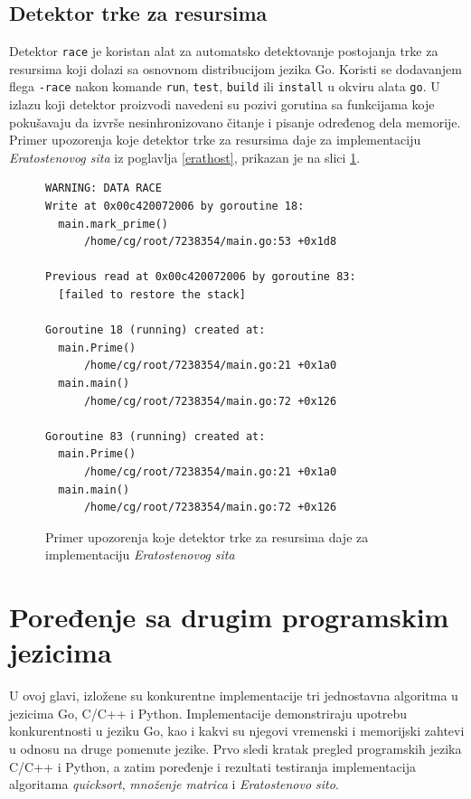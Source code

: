 \documentclass[12pt,oneside]{memoir}
\begin{document}
\section{Detektor trke za resursima} \label{datarace}

Detektor \texttt{race} je koristan alat za automatsko detektovanje postojanja trke za resursima koji dolazi sa osnovnom distribucijom jezika Go. Koristi se dodavanjem flega \texttt{-race} nakon komande \texttt{run}, \texttt{test}, \texttt{build} ili \texttt{install} u okviru alata \texttt{go}. U izlazu koji detektor proizvodi navedeni su pozivi gorutina sa funkcijama koje pokušavaju da izvrše nesinhronizovano čitanje i pisanje određenog dela memorije. Primer upozorenja koje detektor trke za resursima daje za implementaciju \textit{Eratostenovog sita} iz poglavlja \ref{erathost}, prikazan je na slici \ref{fig:datarace}.

\begin{figure}
\begin{center}

\begin{Verbatim}[fontsize=\small]
WARNING: DATA RACE
Write at 0x00c420072006 by goroutine 18:
  main.mark_prime()
      /home/cg/root/7238354/main.go:53 +0x1d8

Previous read at 0x00c420072006 by goroutine 83:
  [failed to restore the stack]

Goroutine 18 (running) created at:
  main.Prime()
      /home/cg/root/7238354/main.go:21 +0x1a0
  main.main()
      /home/cg/root/7238354/main.go:72 +0x126

Goroutine 83 (running) created at:
  main.Prime()
      /home/cg/root/7238354/main.go:21 +0x1a0
  main.main()
      /home/cg/root/7238354/main.go:72 +0x126
\end{Verbatim}

\caption{Primer upozorenja koje detektor trke za resursima daje za implementaciju \textit{Eratostenovog sita}}
\label{fig:datarace}
\end{center}
\end{figure}



\chapter {Poređenje sa drugim programskim jezicima} \label{g4}
U ovoj glavi, izložene su konkurentne implementacije tri jednostavna algoritma u jezicima Go, C/C++ i Python.  Implementacije demonstriraju upotrebu konkurentnosti u jeziku Go, kao i kakvi su njegovi vremenski i memorijski zahtevi u odnosu na druge pomenute jezike. Prvo sledi kratak pregled programskih jezika C/C++ i Python, a zatim poređenje i rezultati testiranja implementacija algoritama \textit{quicksort}, \textit{množenje matrica} i \textit{Eratostenovo sito}.
\end{document}
